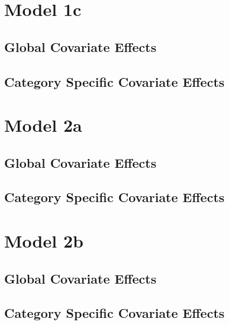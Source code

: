 \documentclass[]{article}
\begin{document}
\section{Model 1c}
\subsection{Global Covariate Effects}

\clearpage
\subsection{Category Specific Covariate Effects}

\clearpage

\section{Model 2a}
\subsection{Global Covariate Effects}

\clearpage
\subsection{Category Specific Covariate Effects}

\clearpage

\section{Model 2b}
\subsection{Global Covariate Effects}

\clearpage
\subsection{Category Specific Covariate Effects}

\clearpage
\end{document}
